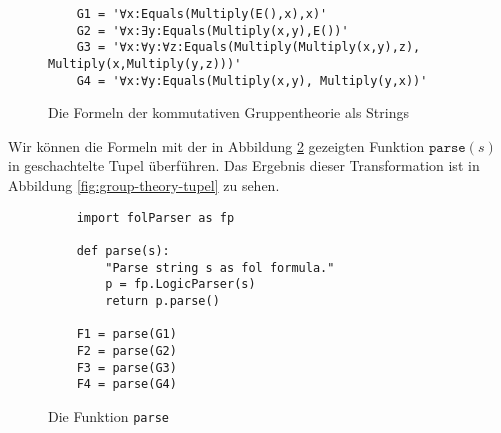 \begin{figure}[!ht]
\centering
\begin{verbatim}
    G1 = '∀x:Equals(Multiply(E(),x),x)'                  
    G2 = '∀x:∃y:Equals(Multiply(x,y),E())'
    G3 = '∀x:∀y:∀z:Equals(Multiply(Multiply(x,y),z), Multiply(x,Multiply(y,z)))'
    G4 = '∀x:∀y:Equals(Multiply(x,y), Multiply(y,x))'
\end{verbatim}
\vspace*{-0.3cm}
\caption{Die Formeln der kommutativen Gruppentheorie als Strings}
\label{fig:group-theory}
\end{figure}

Wir können die Formeln mit der in Abbildung \ref{fig:fol-parse.py} gezeigten Funktion $\texttt{parse}(s)$ in
geschachtelte Tupel überführen.  Das Ergebnis dieser Transformation ist in Abbildung
\ref{fig:group-theory-tupel} zu sehen.


\begin{figure}[!ht]
\centering
\begin{verbatim}
    import folParser as fp
    
    def parse(s):
        "Parse string s as fol formula."
        p = fp.LogicParser(s)
        return p.parse()

    F1 = parse(G1)
    F2 = parse(G2)
    F3 = parse(G3)
    F4 = parse(G4)
\end{verbatim}
\vspace*{-0.3cm}
\caption{Die Funktion \texttt{parse}}
\label{fig:fol-parse.py}
\end{figure}


